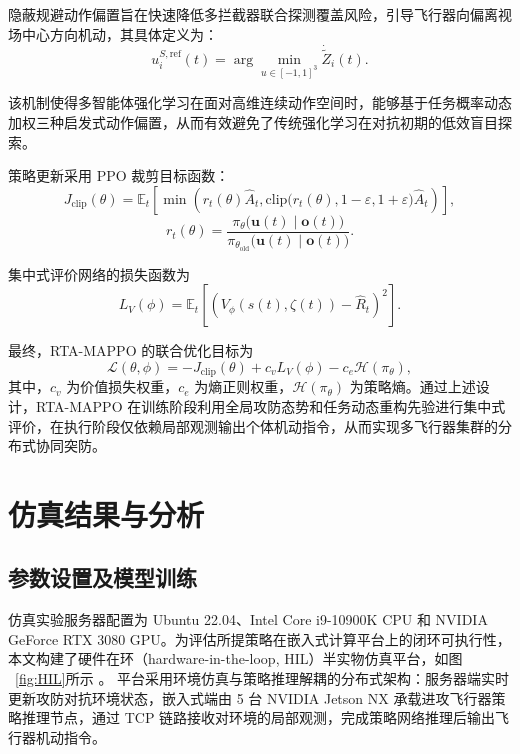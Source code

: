 隐蔽规避动作偏置旨在快速降低多拦截器联合探测覆盖风险，引导飞行器向偏离视场中心方向机动，其具体定义为：
\begin{equation}
u_i^{S,\mathrm{ref}}(t) = \arg\min_{u \in [-1,1]^3} \dot{\widetilde Z}_i(t).
\end{equation}




该机制使得多智能体强化学习在面对高维连续动作空间时，能够基于任务概率动态加权三种启发式动作偏置，从而有效避免了传统强化学习在对抗初期的低效盲目探索。


策略更新采用 PPO 裁剪目标函数：
\begin{equation}
J_{\mathrm{clip}}(\theta)
=
\mathbb E_t
\left[
\min
\left(
r_t(\theta)\hat A_t,
\mathrm{clip}\bigl(r_t(\theta),1-\varepsilon,1+\varepsilon\bigr)\hat A_t
\right)
\right],
\end{equation}
\begin{equation}
r_t(\theta)
=
\frac{
\pi_{\theta}\bigl(\mathbf u(t)\mid \mathbf o(t)\bigr)
}{
\pi_{\theta_{\mathrm{old}}}\bigl(\mathbf u(t)\mid \mathbf o(t)\bigr)
}.
\end{equation}

集中式评价网络的损失函数为
\begin{equation}
L_V(\phi)
=
\mathbb E_t
\left[
\left(
V_{\phi}(s(t),\zeta(t))
-
\hat R_t
\right)^2
\right].
\end{equation}

最终，RTA-MAPPO 的联合优化目标为
\begin{equation}
\mathcal L(\theta,\phi)
=
-J_{\mathrm{clip}}(\theta)
+
c_v L_V(\phi)
-
c_e\mathcal H(\pi_{\theta}),
\end{equation}
其中，$c_v$ 为价值损失权重，$c_e$ 为熵正则权重，$\mathcal H(\pi_{\theta})$ 为策略熵。通过上述设计，RTA-MAPPO 在训练阶段利用全局攻防态势和任务动态重构先验进行集中式评价，在执行阶段仅依赖局部观测输出个体机动指令，从而实现多飞行器集群的分布式协同突防。



\section{仿真结果与分析}
\label{subsec:v71-case-study}

\subsection{参数设置及模型训练}
\label{subsec:algo-net-setting}

仿真实验服务器配置为 Ubuntu 22.04、Intel Core i9-10900K CPU 和 NVIDIA GeForce RTX 3080 GPU。为评估所提策略在嵌入式计算平台上的闭环可执行性，本文构建了硬件在环（hardware-in-the-loop, HIL）半实物仿真平台，如图 ~\ref{fig:HIL}所示 。
平台采用环境仿真与策略推理解耦的分布式架构：服务器端实时更新攻防对抗环境状态，嵌入式端由 5 台 NVIDIA Jetson NX 承载进攻飞行器策略推理节点，通过 TCP 链路接收对环境的局部观测，完成策略网络推理后输出飞行器机动指令。


